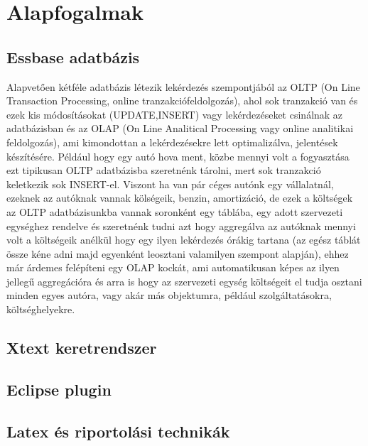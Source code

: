 \chapter{Alapfogalmak}\label{sect:Preliminaries}
\section{Essbase adatbázis}
Alapvetően kétféle adatbázis létezik lekérdezés szempontjából az OLTP (On Line
Transaction Processing, online tranzakciófeldolgozás), ahol sok tranzakció van és ezek kis
módosításokat (UPDATE,INSERT) vagy lekérdezéseket csinálnak az
adatbázisban és az OLAP (On Line Analitical Processing vagy online
analitikai feldolgozás), ami kimondottan a lekérdezésekre lett optimalizálva,
jelentések készítésére. Például hogy egy autó hova ment, közbe mennyi volt a
fogyasztása ezt tipikusan OLTP adatbázisba szeretnénk tárolni, mert sok
tranzakció keletkezik sok INSERT-el. Viszont ha van pár céges autónk egy vállalatnál, ezeknek az autóknak vannak kölségeik, 
benzin, amortizáció, de ezek a költségek az OLTP adatbázisunkba vannak soronként
egy táblába, egy adott szervezeti egységhez rendelve és szeretnénk tudni azt
hogy aggregálva az autóknak mennyi volt a költségeik anélkül hogy egy ilyen
lekérdezés órákig tartana (az egész táblát össze kéne adni majd egyenként
leosztani valamilyen szempont alapján), ehhez már árdemes felépíteni egy OLAP
kockát, ami automatikusan képes az ilyen jellegű aggregációra és arra is hogy az
szervezeti egység költségeit el tudja osztani minden egyes autóra, vagy akár más
objektumra, például szolgáltatásokra, költséghelyekre.

\section{Xtext keretrendszer}

\section{Eclipse plugin}

\section{Latex és riportolási technikák}